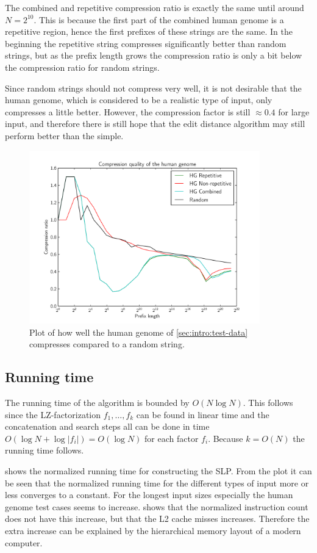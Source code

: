 \documentclass[twoside,11pt,openright]{report}
\begin{document}
The combined and repetitive compression ratio is exactly the same until around $N = 2^{10}$. This is because the first part of the combined human genome is a repetitive region, hence the first prefixes of these strings are the same. In the beginning the repetitive string compresses significantly better than random strings, but as the prefix length grows the compression ratio is only a bit below the compression ratio for random strings.

Since random strings should not compress very well, it is not desirable that the human genome, which is considered to be a realistic type of input, only compresses a little better. However, the compression factor is still $\approx 0.4$ for large input, and therefore there is still hope that the edit distance algorithm may still perform better than the simple.

\begin{figure}[h!]
  \centering
  \includegraphics[width=10cm]{compression/hg}
  \caption{Plot of how well the human genome of \cref{sec:intro:test-data} compresses compared to a random string.}
  \label{fig:compression:quality:hg}
\end{figure}

\subsection{Running time}
The running time of the algorithm is bounded by $O(N\log{N})$. This follows since the LZ-factorization $f_1, \dots, f_k$ can be found in linear time and the concatenation and search steps all can be done in time $O(\log{N} + \log{|f_i|}) = O(\log{N})$ for each factor $f_i$. Because $k = O(N)$ the running time follows.

 shows the normalized running time for constructing the SLP. From the plot it can be seen that the normalized running time for the different types of input more or less converges to a constant. For the longest input sizes especially the human genome test cases seems to increase.  shows that the normalized instruction count does not have this increase, but that the L2 cache misses increases. Therefore the extra increase can be explained by the hierarchical memory layout of a modern computer.
\end{document}
